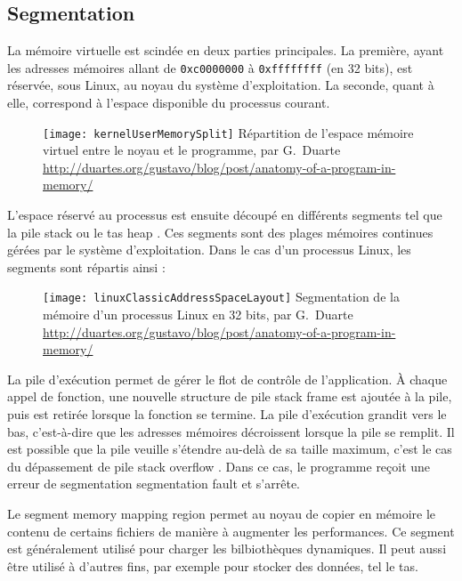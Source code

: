 \subsection{Segmentation}

La mémoire virtuelle est scindée en deux parties principales. La première, ayant les adresses mémoires allant de \texttt{0xc0000000} à \texttt{0xffffffff} (en 32 bits), est réservée, sous Linux, au noyau du système d'exploitation. La seconde, quant à elle, correspond à l'espace disponible du processus courant.

\begin{figure}[H]
	\centering
	\texttt{[image: kernelUserMemorySplit]}
	{Répartition de l'espace mémoire virtuel entre le noyau et le programme, par G.~Duarte}
	{\url{http://duartes.org/gustavo/blog/post/anatomy-of-a-program-in-memory/}}
	\label{fig:kernelUserMemorySplit}
\end{figure}

L'espace réservé au processus est ensuite découpé en différents segments tel que la pile \og stack \fg ou le tas \og heap \fg. Ces segments sont des plages mémoires continues gérées par le système d'exploitation. Dans le cas d'un processus Linux, les segments sont répartis ainsi :

\begin{figure}[H]
	\centering
	\texttt{[image: linuxClassicAddressSpaceLayout]}
	{Segmentation de la mémoire d'un processus Linux en 32 bits, par G.~Duarte}
	{\url{http://duartes.org/gustavo/blog/post/anatomy-of-a-program-in-memory/}}
	\label{fig:linuxClassicAddressSpaceLayout}
\end{figure}

\vfill

La pile d'exécution permet de gérer le flot de contrôle de l'application. À chaque appel de fonction, une nouvelle structure de pile \og stack frame \fg est ajoutée à la pile, puis est retirée lorsque la fonction se termine. La pile d'exécution grandit vers le bas, c'est-à-dire que les adresses mémoires décroissent lorsque la pile se remplit. Il est possible que la pile veuille s'étendre au-delà de sa taille maximum, c'est le cas du dépassement de pile \og stack overflow \fg. Dans ce cas, le programme reçoit une erreur de segmentation \og segmentation fault \fg et s'arrête.

Le segment \og memory mapping region \fg permet au noyau de copier en mémoire le contenu de certains fichiers de manière à augmenter les performances. Ce segment est généralement utilisé pour charger les bilbiothèques dynamiques. Il peut aussi être utilisé à d'autres fins, par exemple pour stocker des données, tel le tas.

